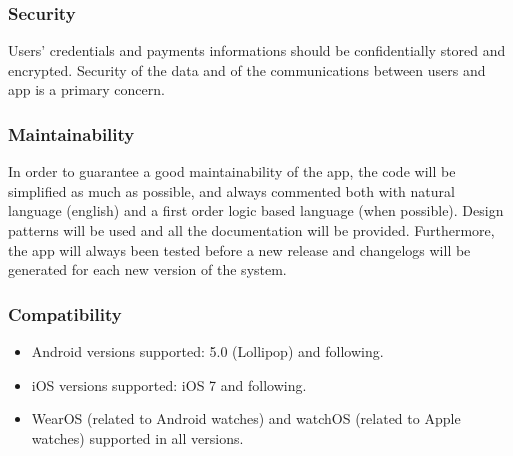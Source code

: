 \subsubsection{Security}
Users' credentials and payments informations should be confidentially stored and encrypted. Security of the data and of the communications between users and app is a primary concern.

\subsubsection{Maintainability}
In order to guarantee a good maintainability of the app, the code will be simplified as much as possible, and always commented both with natural language (english) and a first order logic based language (when possible). Design patterns will be used and all the documentation will be provided. Furthermore, the app will always been tested before a new release and changelogs will be generated for each new version of the system.

\subsubsection{Compatibility}
\begin{itemize}
\item Android versions supported: 5.0 (Lollipop) and following.
\item iOS versions supported: iOS 7 and following.
\item WearOS (related to Android watches) and watchOS (related to Apple watches) supported in all versions.
\end{itemize}

%